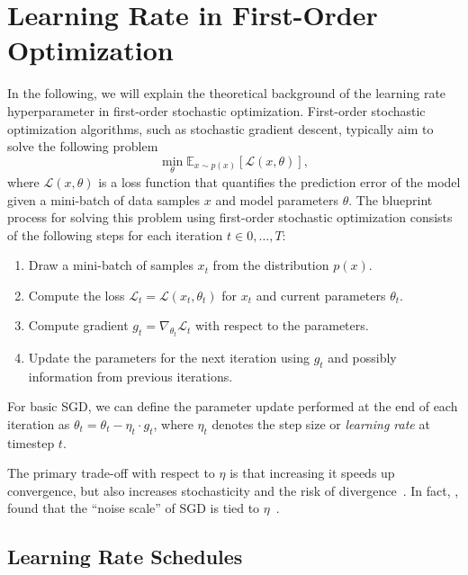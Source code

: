 \documentclass[runningheads]{llncs}
\begin{document}
\section{Learning Rate in First-Order Optimization}

In the following, we will explain the theoretical background of the learning rate hyperparameter in first-order stochastic optimization.
First-order stochastic optimization algorithms, such as stochastic gradient descent, typically aim to solve the following problem
\begin{equation}
	\min_{\theta} \mathbb{E}_{x \sim p(x)} [\mathcal{L}(x, \theta)],
\end{equation}
where $\mathcal{L}(x, \theta)$ is a loss function that quantifies the prediction error of the model given a mini-batch of data samples $x$ and model parameters $\theta$.
The blueprint process for solving this problem using first-order stochastic optimization consists of the following steps for each iteration $t \in 0, \ldots, T$:
\begin{enumerate}
	\item Draw a mini-batch of samples $x_t$ from the distribution $p(x)$.
	\item Compute the loss $\mathcal{L}_t = \mathcal{L}(x_t, \theta_t)$ for $x_t$ and current parameters $\theta_t$.
	\item Compute gradient $g_t = \nabla_{\theta_t} \mathcal{L}_t$ with respect to the parameters.
	\item Update the parameters for the next iteration using $g_t$ and possibly information from previous iterations.
\end{enumerate}

For basic SGD, we can define the parameter update performed at the end of each iteration as
$\theta_{t}  = \theta_{t} - \eta_t \cdot g_t$,
where $\eta_t$ denotes the step size or \textit{learning rate} at timestep $t$.

The primary trade-off with respect to $\eta$ is that increasing it speeds up convergence, but also increases stochasticity and the risk of divergence~\cite{bengioPracticalRecommendationsGradientbased2012}.
In fact, \textcite{smithBayesianPerspectiveGeneralization2018}, found that the “noise scale” of SGD is tied to $\eta$~\cite{smithBayesianPerspectiveGeneralization2018}.

\subsection{Learning Rate Schedules}
\end{document}
